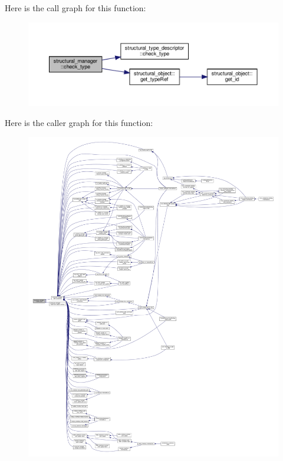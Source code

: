 Here is the call graph for this function\+:
\nopagebreak
\begin{figure}[H]
\begin{center}
\leavevmode
\includegraphics[width=350pt]{d7/d6b/classstructural__manager_a939e3ab0ee909c9008fc787d399a117c_cgraph}
\end{center}
\end{figure}
Here is the caller graph for this function\+:
\nopagebreak
\begin{figure}[H]
\begin{center}
\leavevmode
\includegraphics[width=350pt]{d7/d6b/classstructural__manager_a939e3ab0ee909c9008fc787d399a117c_icgraph}
\end{center}
\end{figure}
\mbox{\label{classstructural__manager_a06768a4a0fd1f26e78cbd1186c433261}} 
